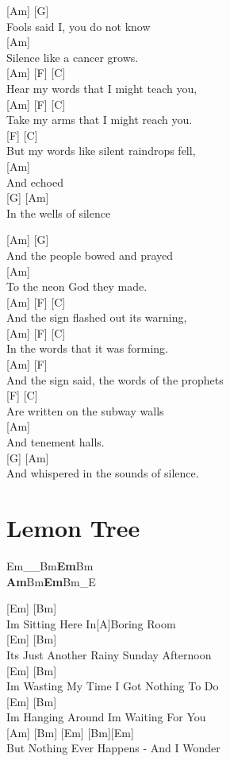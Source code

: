 \documentclass[
  letterpaper,
]{scrbook}
\begin{document}
{[}Am{]} {[}G{]}\\
Fools said I, you do not know\\
{[}Am{]}\\
Silence like a cancer grows.\\
{[}Am{]} {[}F{]} {[}C{]}\\
Hear my words that I might teach you,\\
{[}Am{]} {[}F{]} {[}C{]}\\
Take my arms that I might reach you.\\
{[}F{]} {[}C{]}\\
But my words like silent raindrops fell,\\
{[}Am{]}\\
And echoed\\
{[}G{]} {[}Am{]}\\
In the wells of silence

{[}Am{]} {[}G{]}\\
And the people bowed and prayed\\
{[}Am{]}\\
To the neon God they made.\\
{[}Am{]} {[}F{]} {[}C{]}\\
And the sign flashed out its warning,\\
{[}Am{]} {[}F{]} {[}C{]}\\
In the words that it was forming.\\
{[}Am{]} {[}F{]}\\
And the sign said, the words of the prophets\\
{[}F{]} {[}C{]}\\
Are written on the subway walls\\
{[}Am{]}\\
And tenement halls.\\
{[}G{]} {[}Am{]}\\
And whispered in the sounds of silence.

\hypertarget{lemon-tree}{%
\chapter{Lemon Tree}\label{lemon-tree}}

Em\_\_\textbar Bm\textbf{\textbar Em}\textbar Bm\textbf{\textbar{}\\
Am}\textbar Bm\textbf{\textbar Em}\textbar Bm\_E\textbar{}

{[}Em{]} {[}Bm{]}\\
I\textquotesingle m Sitting Here In{[}A{]}Boring Room\\
{[}Em{]} {[}Bm{]}\\
It\textquotesingle s Just Another Rainy Sunday Afternoon\\
{[}Em{]} {[}Bm{]}\\
I\textquotesingle m Wasting My Time I Got Nothing To Do\\
{[}Em{]} {[}Bm{]}\\
I\textquotesingle m Hanging Around I\textquotesingle m Waiting For You\\
{[}Am{]} {[}Bm{]} {[}Em{]} {[}Bm{]}{[}Em{]}\\
But Nothing Ever Happens - And I Wonder
\end{document}
